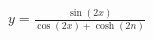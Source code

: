\documentclass[preview]{standalone}
\begin{document}
\begin{align*}
y = \frac{\sin(2x)}{\cos(2x)+\cosh(2n)}
\end{align*}
\end{document}
